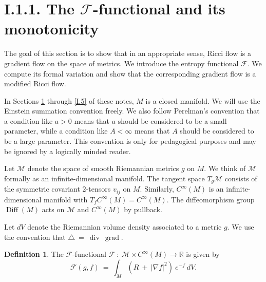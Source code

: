 \documentclass[12pt]{amsart}
\newcommand{\Diff}{\operatorname{Diff}}
\newcommand{\Div}{\operatorname{div}}
\newcommand{\grad}{\operatorname{grad}}
\newcommand{\R}{{\mathbb R}}
\numberwithin{equation}{section}
\theoremstyle{plain}
\theoremstyle{definition}
\newtheorem{definition}[equation]{Definition}
\theoremstyle{remark}
\begin{document}
\section{I.1.1. The ${\mathcal F}$-functional and its
monotonicity} \label{I.1.1}
\label{Derivation of first equation of Section 1.1}

The goal of this section is to show that in an appropriate sense, Ricci
flow is a gradient flow on the space of metrics. 
We introduce the entropy functional ${\mathcal F}$.
We compute its formal variation and show that the corresponding
gradient flow is a modified Ricci flow.

In Sections \ref{I.1.1} through \ref{I.5} of these notes,  $M$ 
is a closed manifold.  
We will use the Einstein summation convention freely. We also follow
Perelman's convention that a condition like $a > 0$ means that
$a$ should be considered to be a small parameter, while a condition
like $A < \infty$ means that $A$ should be considered to be a large
parameter. This convention is only for pedagogical purposes and
may be ignored by a logically minded reader.


Let ${\mathcal M}$ denote the space of smooth Riemannian metrics $g$ on
$M$. We think of ${\mathcal M}$ formally as an infinite-dimensional
manifold.  The tangent space $T_g {\mathcal M}$ consists of the
symmetric covariant $2$-tensors $v_{ij}$ on $M$. Similarly, $C^\infty(M)$
is an infinite-dimensional manifold with $T_f C^\infty(M) = 
C^\infty(M)$. 
The diffeomorphism group
$\Diff(M)$ acts on ${\mathcal M}$ and $C^\infty(M)$ by pullback.

Let $dV$ denote the Riemannian volume density associated to a metric $g$.
We use the convention that
$\triangle \: = \: \Div \: \grad$.

\begin{definition}
The ${\mathcal F}$-functional ${\mathcal F} \: : \: {\mathcal M} \times C^\infty(M)
\rightarrow \R$ is given by
\begin{equation}
{\mathcal F}(g, f) \: = \:
\int_M \left( R \: + \: |\nabla f|^2 \right) \: e^{-f} \: dV .
\end{equation}
\end{definition}
\end{document}
